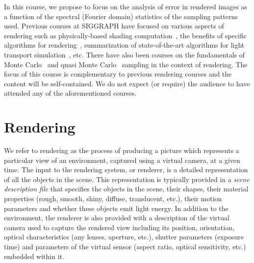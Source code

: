 \documentclass[11pt,fleqn]{book} %
\newcommand{\TBC} {\noindent [TO BE COMPLETED IN THE FINAL VERSION.] }
\begin{document}
In this course, we propose to focus on the analysis of error in rendered images as a function of the spectral (Fourier domain) statistics of the sampling patterns used.  Previous courses at SIGGRAPH have focused on various aspects of rendering such as physically-based shading computation~\cite{Hill:2015:PBSCourse}, the benefits of specific algorithms for rendering~\cite{Keller:2015:PTRCourse,hachisuka13starpm}, summarization of state-of-the-art algorithms for light transport simulation~\cite{Krivanek:2014:RALCourse}, etc. There have also been courses on the fundamentals of Monte Carlo~\cite{Jensen2003Course} and quasi Monte Carlo~\cite{Keller:2012:AMCCourse} sampling in the context of rendering. The focus of this course is complementary to previous rendering courses and the content will be self-contained. We do not expect (or require) the audience to have attended any of the aforementioned courses.


\section{Rendering}
We refer to rendering as the process of producing a picture which represents a particular view of an environment, captured using a virtual camera, at a given time. The input to the rendering system, or renderer, is a detailed representation of all the objects in the scene. This representation is typically provided in a \textit{scene description file} that specifies the objects in the scene, their shapes, their material properties (rough, smooth, shiny, diffuse, translucent, etc.), their motion parameters and whether these objects emit light energy. In addition to the environment, the renderer is also provided with a description of the virtual camera used to capture the rendered view including its position, orientation, optical characteristics (any lenses, aperture, etc.), shutter parameters (exposure time)  and parameters of the virtual sensor (aspect ratio, optical sensitivity, etc.) embedded within it. 

\TBC 
\end{document}

